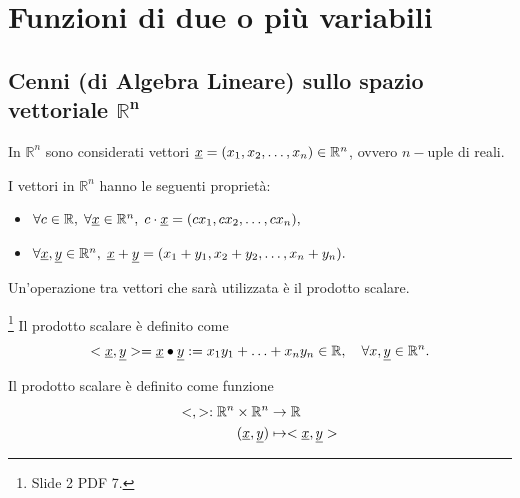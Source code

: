 \section{Funzioni di due o più variabili}
\subsection{Cenni (di Algebra Lineare) sullo spazio vettoriale \texorpdfstring{$\boldsymbol{\mathbb R^n}$}{Rn}}
In $\mathbb R^n$ sono considerati vettori $\uline x=(x_1,x_2,\hdots,x_n)\in \mathbb R^n$, ovvero $n-$uple di reali.

\begin{property}
    I vettori in $\mathbb R^n$ hanno le seguenti proprietà:
    \begin{itemize}
        \item $\forall c\in\mathbb R,\; \forall\uline x\in\mathbb R^n,\; c\cdot\uline x=(cx_1,cx_2,\hdots,cx_n),$
        \item $\forall\uline x,\uline y\in\mathbb R^n,\; \uline x+\uline y= (x_1+y_1,x_2+y_2,\hdots,x_n+y_n).$
    \end{itemize}
\end{property}

Un'operazione tra vettori che sarà utilizzata è il prodotto scalare.
\begin{definition}\footnote{Slide 2 PDF 7.}
    Il prodotto scalare è definito come
    \begin{equation*}
        <\uline x,\uline y> = \uline x \bullet \uline y := x_1y_1+\hdots+x_ny_n\in\mathbb R,\quad \forall\mathbb\uline x, \uline y\in\mathbb R^n.
    \end{equation*}
\end{definition}
\begin{remark}
    Il prodotto scalare è definito come funzione
    \begin{align*}
        <,>:\mathbb R^n\times\mathbb R^n &\rightarrow\mathbb R\\
        (\uline x,\uline y) &\mapsto <\uline x,\uline y>
    \end{align*}
\end{remark}

